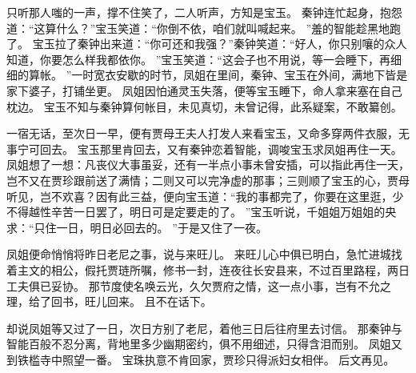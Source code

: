 只听那人嗤的一声，撑不住笑了，二人听声，方知是宝玉。
秦钟连忙起身，抱怨道：“这算什么？”宝玉笑道：“你倒不依，咱们就叫喊起来。
”羞的智能趁黑地跑了。
宝玉拉了秦钟出来道：“你可还和我强？”秦钟笑道：“好人，你只别嚷的众人知道，你要怎么样我都依你。
”宝玉笑道：“这会子也不用说，等一会睡下，再细细的算帐。
”一时宽衣安歇的时节，凤姐在里间，秦钟、宝玉在外间，满地下皆是家下婆子，打铺坐更。
凤姐因怕通灵玉失落，便等宝玉睡下，命人拿来塞在自己枕边。
宝玉不知与秦钟算何帐目，未见真切，未曾记得，此系疑案，不敢纂创。
\par
一宿无话，至次日一早，便有贾母王夫人打发人来看宝玉，又命多穿两件衣服，无事宁可回去。
宝玉那里肯回去，又有秦钟恋着智能，调唆宝玉求凤姐再住一天。
凤姐想了一想：凡丧仪大事虽妥，还有一半点小事未曾安插，可以指此再住一天，岂不又在贾珍跟前送了满情；二则又可以完净虚的那事；三则顺了宝玉的心，贾母听见，岂不欢喜？因有此三益，便向宝玉道：“我的事都完了，你要在这里逛，少不得越性辛苦一日罢了，明日可是定要走的了。
”宝玉听说，千姐姐万姐姐的央求：“只住一日，明日必回去的。
”于是又住了一夜。
\par
凤姐便命悄悄将昨日老尼之事，说与来旺儿。
来旺儿心中俱已明白，急忙进城找着主文的相公，假托贾琏所嘱，修书一封，连夜往长安县来，不过百里路程，两日工夫俱已妥协。
那节度使名唤云光，久欠贾府之情，这一点小事，岂有不允之理，给了回书，旺儿回来。
且不在话下。
\par
却说凤姐等又过了一日，次日方别了老尼，着他三日后往府里去讨信。
那秦钟与智能百般不忍分离，背地里多少幽期密约，俱不用细述，只得含泪而别。
凤姐又到铁槛寺中照望一番。
宝珠执意不肯回家，贾珍只得派妇女相伴。
后文再见。
\par
